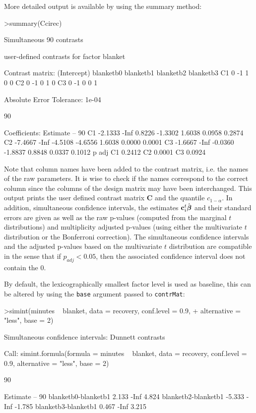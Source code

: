 \documentclass{article}
\newcommand{\bbeta}{\mbox{\boldmath $\beta$}}
\newcommand{\bc}{{\mathbf{c}}}
\newcommand{\bC}{{\mathbf{C}}}
\begin{document}
More detailed output is available by using the summary method:
\small
\begin{Schunk}
\begin{Sinput}
>summary(Ccirec)
\end{Sinput}
\begin{Soutput}
	Simultaneous 90% confidence intervals: user-defined
	contrasts

	 user-defined contrasts for factor blanket

Contrast matrix:
   (Intercept) blanketb0 blanketb1 blanketb2 blanketb3
C1           0        -1         1         0         0
C2           0        -1         0         1         0
C3           0        -1         0         0         1

Absolute Error Tolerance:  1e-04 

 90 % quantile:  1.8431 

Coefficients:
   Estimate   --    90 % t value Std.Err.  p raw p Bonf
C1  -2.1333 -Inf  0.8226 -1.3302   1.6038 0.0958 0.2874
C2  -7.4667 -Inf -4.5108 -4.6556   1.6038 0.0000 0.0001
C3  -1.6667 -Inf -0.0360 -1.8837   0.8848 0.0337 0.1012
    p adj
C1 0.2412
C2 0.0001
C3 0.0924
\end{Soutput}
\end{Schunk}
Note that column names have been added to the contrast matrix, i.e. the
names of the raw parameters. It is wise to check if the names correspond to
the correct column since the columns of the design matrix may have been
interchanged. 
\normalsize
This output prints the user defined contrast matrix $\bC$ 
and the quantile $c_{1-\alpha}$. In addition,
simultaneous confidence intervals, the estimates $\bc_i^t
\hat{\bbeta}$ and their standard errors are given as well as the raw
p-values (computed from the marginal $t$ distributions) and
multiplicity adjusted p-values (using either the multivariate $t$ distribution or
the Bonferroni correction). The simultaneous confidence intervals
and the adjusted p-values based on the multivariate $t$ distribution are compatible in
the sense that if $p_{adj}<0.05$, then the associated confidence
interval does not contain the 0.

By default, the lexicographically smallest factor level is used as baseline,
this can be altered by using the \texttt{base} argument passed to
\texttt{contrMat}:
\small
\begin{Schunk}
\begin{Sinput}
>simint(minutes ~ blanket, data = recovery, conf.level = 0.9, 
+     alternative = "less", base = 2)
\end{Sinput}
\begin{Soutput}
	Simultaneous confidence intervals: Dunnett
	contrasts

Call: 
simint.formula(formula = minutes ~ blanket, data = recovery, 
    conf.level = 0.9, alternative = "less", base = 2)

	90 % confidence intervals

                    Estimate   --   90 %
blanketb0-blanketb1    2.133 -Inf  4.824
blanketb2-blanketb1   -5.333 -Inf -1.785
blanketb3-blanketb1    0.467 -Inf  3.215
\end{Soutput}
\end{Schunk}
\normalsize
\end{document}
